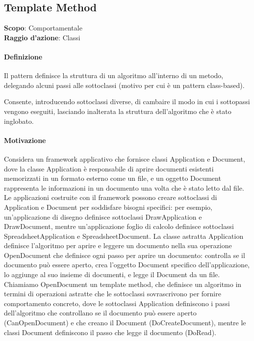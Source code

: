 \subsection{Template Method}
\label{template-method}

\textbf{Scopo}: Comportamentale \\
\textbf{Raggio d'azione}: Classi

\paragraph{Definizione} Il pattern definisce la struttura di un algoritmo all'interno di un metodo, delegando alcuni passi alle sottoclassi (motivo per cui è un pattern class-based).

Consente, introducendo sottoclassi diverse, di cambaire il modo in cui i sottopassi vengono eseguiti, lasciando inalterata la struttura dell'algoritmo che è stato inglobato.

\paragraph{Motivazione} Considera un framework applicativo che fornisce classi Application e Document, dove la classe Application è responsabile di aprire documenti esistenti memorizzati in un formato esterno come un file, e un oggetto Document rappresenta le informazioni in un documento una volta che è stato letto dal file. Le applicazioni costruite con il framework possono creare sottoclassi di Application e Document per soddisfare bisogni specifici: per esempio, un'applicazione di disegno definisce sottoclassi DrawApplication e DrawDocument, mentre un'applicazione foglio di calcolo definisce sottoclassi SpreadsheetApplication e SpreadsheetDocument. La classe astratta Application definisce l'algoritmo per aprire e leggere un documento nella sua operazione OpenDocument che definisce ogni passo per aprire un documento: controlla se il documento può essere aperto, crea l'oggetto Document specifico dell'applicazione, lo aggiunge al suo insieme di documenti, e legge il Document da un file. Chiamiamo OpenDocument un template method, che definisce un algoritmo in termini di operazioni astratte che le sottoclassi sovrascrivono per fornire comportamento concreto, dove le sottoclassi Application definiscono i passi dell'algoritmo che controllano se il documento può essere aperto (CanOpenDocument) e che creano il Document (DoCreateDocument), mentre le classi Document definiscono il passo che legge il documento (DoRead).

